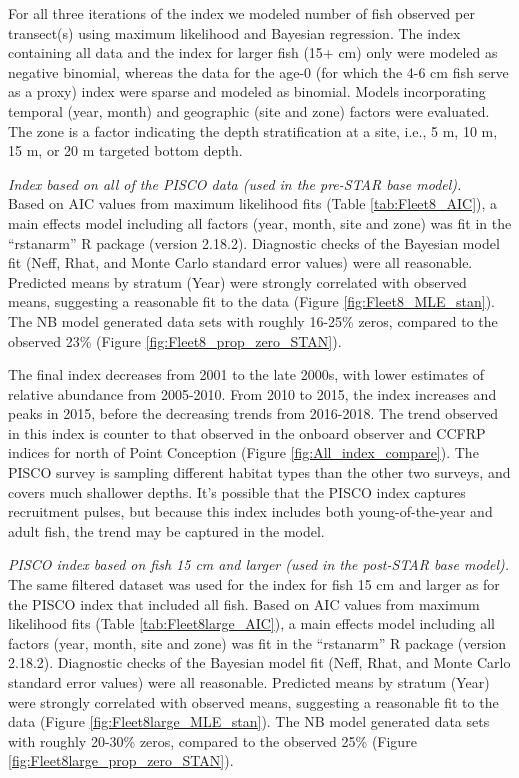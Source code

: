 \documentclass[12pt,]{article}
\begin{document}
For all three iterations of the index we modeled number of fish observed
per transect(s) using maximum likelihood and Bayesian regression. The
index containing all data and the index for larger fish (15+ cm) only
were modeled as negative binomial, whereas the data for the age-0 (for
which the 4-6 cm fish serve as a proxy) index were sparse and modeled as
binomial. Models incorporating temporal (year, month) and geographic
(site and zone) factors were evaluated. The zone is a factor indicating
the depth stratification at a site, i.e., 5 m, 10 m, 15 m, or 20 m
targeted bottom depth.

\emph{Index based on all of the PISCO data (used in the pre-STAR base
model).}\\
Based on AIC values from maximum likelihood fits (Table
\ref{tab:Fleet8_AIC}), a main effects model including all factors (year,
month, site and zone) was fit in the ``rstanarm'' R package (version
2.18.2). Diagnostic checks of the Bayesian model fit (Neff, Rhat, and
Monte Carlo standard error values) were all reasonable. Predicted means
by stratum (Year) were strongly correlated with observed means,
suggesting a reasonable fit to the data (Figure
\ref{fig:Fleet8_MLE_stan}). The NB model generated data sets with
roughly 16-25\% zeros, compared to the observed 23\% (Figure
\ref{fig:Fleet8_prop_zero_STAN}).

The final index decreases from 2001 to the late 2000s, with lower
estimates of relative abundance from 2005-2010. From 2010 to 2015, the
index increases and peaks in 2015, before the decreasing trends from
2016-2018. The trend observed in this index is counter to that observed
in the onboard observer and CCFRP indices for north of Point Conception
(Figure \ref{fig:All_index_compare}). The PISCO survey is sampling
different habitat types than the other two surveys, and covers much
shallower depths. It's possible that the PISCO index captures
recruitment pulses, but because this index includes both
young-of-the-year and adult fish, the trend may be captured in the
model.

\emph{PISCO index based on fish 15 cm and larger (used in the post-STAR
base model).}\\
The same filtered dataset was used for the index for fish 15 cm and
larger as for the PISCO index that included all fish. Based on AIC
values from maximum likelihood fits (Table \ref{tab:Fleet8large_AIC}), a
main effects model including all factors (year, month, site and zone)
was fit in the ``rstanarm'' R package (version 2.18.2). Diagnostic
checks of the Bayesian model fit (Neff, Rhat, and Monte Carlo standard
error values) were all reasonable. Predicted means by stratum (Year)
were strongly correlated with observed means, suggesting a reasonable
fit to the data (Figure \ref{fig:Fleet8large_MLE_stan}). The NB model
generated data sets with roughly 20-30\% zeros, compared to the observed
25\% (Figure \ref{fig:Fleet8large_prop_zero_STAN}).
\end{document}
